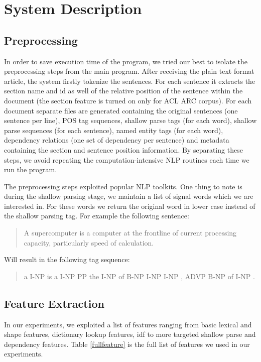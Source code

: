 \documentclass[hyp]{socreport}
\begin{document}
\section{System Description}
\subsection{Preprocessing}
In order to save execution time of the program, we tried our best to isolate the preprocessing steps from the main program. After receiving the plain text format article, the system firstly tokenize the sentences. For each sentence it extracts the section name and id as well of the relative position of the sentence within the document (the section feature is turned on only for ACL ARC corpus). For each document separate files are generated containing the original sentences (one sentence per line), POS tag sequences, shallow parse tags (for each word), shallow parse sequences (for each sentence), named entity tags (for each word), dependency relations (one set of dependency per sentence) and metadata containing the section and sentence position information. By separating these steps, we avoid repeating the computation-intensive NLP routines each time we run the program.

The preprocessing steps exploited popular NLP toolkits. One thing to note is during the shallow parsing stage, we maintain a list of signal words which we are interested in. For these words we return the original word in lower case instead of the shallow parsing tag. For example the following sentence:

\begin{quotation}
A supercomputer is a computer at the frontline of current processing capacity, particularly speed of calculation.
\end{quotation}
\noindent
Will result in the following tag sequence:
\begin{quotation}
a I-NP is a I-NP PP the I-NP of B-NP I-NP I-NP , ADVP B-NP of I-NP .
\end{quotation}

\subsection{Feature Extraction}

In our experiments, we exploited a list of features ranging from basic lexical and shape features, dictionary lookup features, idf to more targeted shallow parse and dependency features. Table \ref{fullfeature} is the full list of features we used in our experiments.
\end{document}
